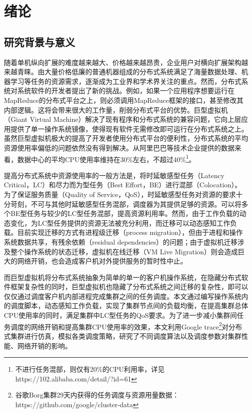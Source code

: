 
\chapter{绪论}
\label{chap:Intro}
\section{研究背景与意义}
随着单机纵向扩展的难度越来越大、价格越来越昂贵，企业用户对横向扩展架构越来越青睐。由大量价格低廉的普通机器组成的分布式系统满足了海量数据处理、机器学习等任务的资源需求，逐渐成为工业界和学术界关注的重点。然而，分布式系统对系统软件的开发者提出了新的挑战。例如，如果一个应用程序想要运行在MapReduce\cite{MapReduce}的分布式平台之上，则必须调用MapReduce框架的接口，甚至修改其内部逻辑。这将会带来很大的工作量，削弱分布式平台的优势。巨型虚拟机（Giant Virtual Machine）\cite{giantvm}解决了现有程序和分布式系统的兼容问题，它向上层应用提供了单一操作系统镜像，使得现有软件无需修改即可运行在分布式系统之上。虽然巨型虚拟机极大的提高了开发者使用分布式平台的便利性，分布式系统的平均资源使用率偏低的问题依然没有得到解决。从阿里巴巴等技术企业提供的数据来看，数据中心的平均CPU使用率维持在30\%左右，不超过40\%\footnote{不进行任务混部，则仅有20\%的CPU利用率，详见https://102.alibaba.com/detail/?id=61}。

提高分布式系统中资源使用率的一般方法是，将时延敏感型任务（Latency Critical，LC）和尽力而为型任务（Best Effort，BE）进行混部（Colocation）。为了保证服务质量（Quality of Service，QoS），时延敏感型任务对资源的要求十分苛刻，不可与其他时延敏感型任务混部，调度器为其提供足够的资源。可以将多个BE型任务与较少的LC型任务混部，提高资源利用率。然而，由于工作负载的动态变化，为LC型任务提供的资源无法被充分利用，而迁移可以动态感知工作负载。目前实现迁移的方式有进程级迁移（process migration），但由于进程和操作系统数据共享，有残余依赖（residual dependencies）\cite{residual}的问题；由于虚拟机迁移涉及整个操作系统的状态迁移，虚拟机在线迁移（VM Live Migration）\cite{livemigration}则会造成巨大的网络开销，也会造成客户机对外提供服务的暂时性中止。

而巨型虚拟机将分布式系统抽象为简单的单一的客户机操作系统，在隐藏分布式软件框架复杂性的同时，巨型虚拟机也隐藏了分布式系统之间迁移的复杂性，即可以仅仅通过调度客户机内部进程完成集群之间的任务调度。本文通过编写操作系统内的调度脚本，动态感知工作负载，实现了集群节点间的负载均衡，在提高集群总体CPU使用率的同时，满足集群中LC型任务的QoS要求。为了进一步减小集群间任务调度的网络开销和提高集群CPU使用率的效果，本文利用Google trace\footnote{谷歌Borg集群29天内获得的任务调度与资源用量数据：https://github.com/google/cluster-data}对分布式集群进行仿真，模拟各类调度策略，研究了不同调度算法以及调度参数对集群性能、网络开销的影响。

